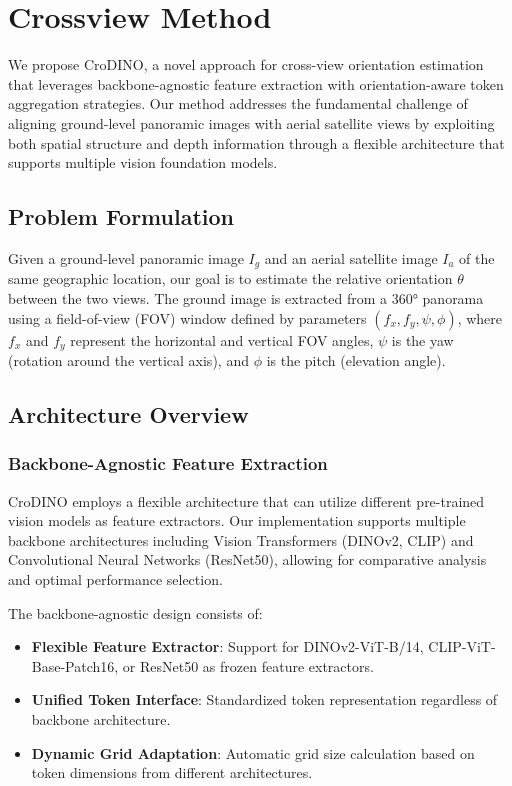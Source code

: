 \section{Crossview Method}
\label{sec:method}

We propose CroDINO, a novel approach for cross-view orientation estimation that leverages backbone-agnostic feature extraction with orientation-aware token aggregation strategies. Our method addresses the fundamental challenge of aligning ground-level panoramic images with aerial satellite views by exploiting both spatial structure and depth information through a flexible architecture that supports multiple vision foundation models.

\subsection{Problem Formulation}

Given a ground-level panoramic image $I_g$ and an aerial satellite image $I_a$ of the same geographic location, our goal is to estimate the relative orientation $\theta$ between the two views. The ground image is extracted from a 360° panorama using a field-of-view (FOV) window defined by parameters $(f_x, f_y, \psi, \phi)$, where $f_x$ and $f_y$ represent the horizontal and vertical FOV angles, $\psi$ is the yaw (rotation around the vertical axis), and $\phi$ is the pitch (elevation angle).

\subsection{Architecture Overview}

\subsubsection{Backbone-Agnostic Feature Extraction}

CroDINO employs a flexible architecture that can utilize different pre-trained vision models as feature extractors. Our implementation supports multiple backbone architectures including Vision Transformers (DINOv2, CLIP) and Convolutional Neural Networks (ResNet50), allowing for comparative analysis and optimal performance selection.

The backbone-agnostic design consists of:
\begin{itemize}
    \item \textbf{Flexible Feature Extractor}: Support for DINOv2-ViT-B/14, CLIP-ViT-Base-Patch16, or ResNet50 as frozen feature extractors.
    \item \textbf{Unified Token Interface}: Standardized token representation regardless of backbone architecture.
    \item \textbf{Dynamic Grid Adaptation}: Automatic grid size calculation based on token dimensions from different architectures.
\end{itemize}

